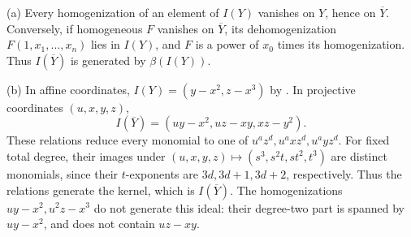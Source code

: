 (a) Every homogenization of an element of $I(Y)$ vanishes on $Y$, hence on $\overline Y$. Conversely, if homogeneous $F$ vanishes on $\overline Y$, its dehomogenization $F(1,x_1,\ldots,x_n)$ lies in $I(Y)$, and $F$ is a power of $x_0$ times its homogenization. Thus $I(\overline Y)$ is generated by $\beta(I(Y))$.

(b) In affine coordinates, $I(Y)=(y-x^2,z-x^3)$ by . In projective coordinates $(u,x,y,z)$,
\[I(\overline Y)=(uy-x^2,uz-xy,xz-y^2).\]
These relations reduce every monomial to one of $u^az^d,u^axz^d,u^ayz^d$. For fixed total degree, their images under $(u,x,y,z)\mapsto(s^3,s^2t,st^2,t^3)$ are distinct monomials, since their $t$-exponents are $3d,3d+1,3d+2$, respectively. Thus the relations generate the kernel, which is $I(\overline Y)$. The homogenizations $uy-x^2,u^2z-x^3$ do not generate this ideal: their degree-two part is spanned by $uy-x^2$, and does not contain $uz-xy$.
